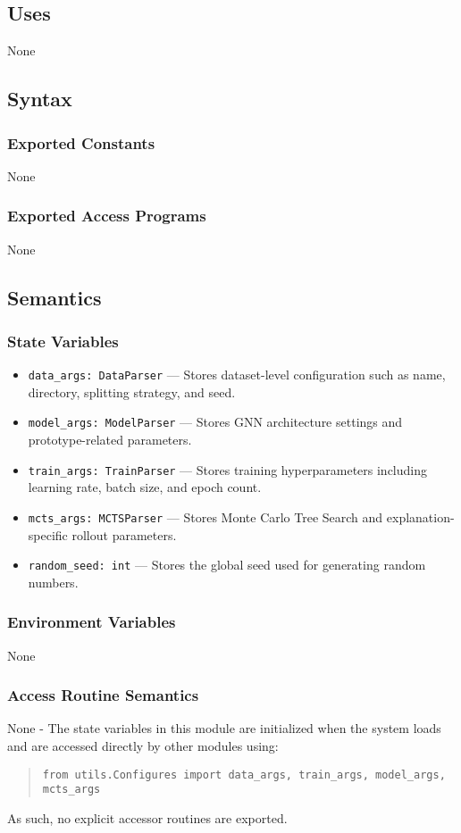 \documentclass[12pt, titlepage]{article}
\begin{document}
\subsection{Uses}
None

\subsection{Syntax}

\subsubsection{Exported Constants}
None

\subsubsection{Exported Access Programs}
None

\subsection{Semantics}

\subsubsection{State Variables}
\begin{itemize}
  \item \texttt{data\_args: DataParser} — Stores dataset-level configuration such as name, directory, splitting strategy, and seed.
  \item \texttt{model\_args: ModelParser} — Stores GNN architecture settings and prototype-related parameters.
  \item \texttt{train\_args: TrainParser} — Stores training hyperparameters including learning rate, batch size, and epoch count.
  \item \texttt{mcts\_args: MCTSParser} — Stores Monte Carlo Tree Search and explanation-specific rollout parameters.
  \item \texttt{random\_seed: int} — Stores the global seed used for generating random numbers.
\end{itemize}

\subsubsection{Environment Variables}
None

\subsubsection{Access Routine Semantics}
None - The state variables in this module are initialized when the system loads and are accessed directly by other modules using:
\begin{quote}
\texttt{from utils.Configures import data\_args, train\_args, model\_args, mcts\_args}
\end{quote}
As such, no explicit accessor routines are exported.
\end{document}
